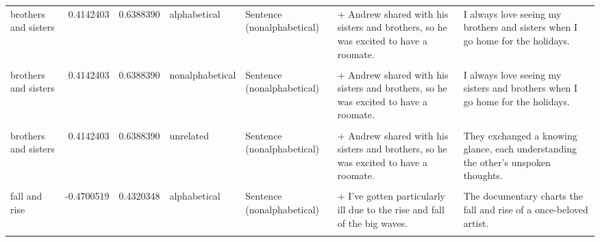 \documentclass[
  12pt,
]{scrartcl}
\begin{document}
\begin{landscape}
\begin{longtable}{lrrllll}
brothers and sisters & 0.4142403 & 0.6388390 & alphabetical & Sentence (nonalphabetical) & + Andrew shared with his sisters and brothers, so he was excited to have a roomate. & I always love seeing my brothers and sisters when I go home for the holidays.\\
\cellcolor{gray!6}{brothers and sisters} & \cellcolor{gray!6}{0.4142403} & \cellcolor{gray!6}{0.6388390} & \cellcolor{gray!6}{nonalphabetical} & \cellcolor{gray!6}{Sentence (alphabetical)} & \cellcolor{gray!6}{+ Andrew shared with his brothers and sisters, so he was excited to have a roomate.} & \cellcolor{gray!6}{I always love seeing my sisters and brothers when I go home for the holidays.}\\
brothers and sisters & 0.4142403 & 0.6388390 & nonalphabetical & Sentence (nonalphabetical) & + Andrew shared with his sisters and brothers, so he was excited to have a roomate. & I always love seeing my sisters and brothers when I go home for the holidays.\\
\addlinespace
\cellcolor{gray!6}{brothers and sisters} & \cellcolor{gray!6}{0.4142403} & \cellcolor{gray!6}{0.6388390} & \cellcolor{gray!6}{unrelated} & \cellcolor{gray!6}{Sentence (alphabetical)} & \cellcolor{gray!6}{+ Andrew shared with his brothers and sisters, so he was excited to have a roomate.} & \cellcolor{gray!6}{They exchanged a knowing glance, each understanding the other's unspoken thoughts.}\\
brothers and sisters & 0.4142403 & 0.6388390 & unrelated & Sentence (nonalphabetical) & + Andrew shared with his sisters and brothers, so he was excited to have a roomate. & They exchanged a knowing glance, each understanding the other's unspoken thoughts.\\
\cellcolor{gray!6}{fall and rise} & \cellcolor{gray!6}{-0.4700519} & \cellcolor{gray!6}{0.4320348} & \cellcolor{gray!6}{alphabetical} & \cellcolor{gray!6}{Sentence (alphabetical)} & \cellcolor{gray!6}{+ I've gotten particularly ill due to the fall and rise of the big waves.} & \cellcolor{gray!6}{The documentary charts the fall and rise of a once-beloved artist.}\\
fall and rise & -0.4700519 & 0.4320348 & alphabetical & Sentence (nonalphabetical) & + I've gotten particularly ill due to the rise and fall of the big waves. & The documentary charts the fall and rise of a once-beloved artist.\\
\cellcolor{gray!6}{fall and rise} & \cellcolor{gray!6}{-0.4700519} & \cellcolor{gray!6}{0.4320348} & \cellcolor{gray!6}{nonalphabetical} & \cellcolor{gray!6}{Sentence (alphabetical)} & \cellcolor{gray!6}{+ I've gotten particularly ill due to the fall and rise of the big waves.} & \cellcolor{gray!6}{The documentary charts the rise and fall of a once-beloved artist.}\\

\end{longtable}
\end{landscape}
\end{document}

